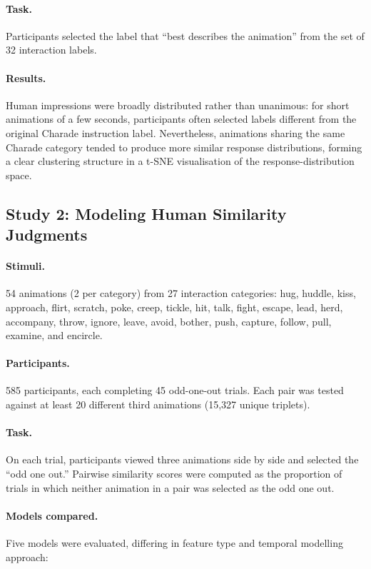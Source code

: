 \documentclass[11pt,a4paper]{article}
\begin{document}
\paragraph{Task.} Participants selected the label that ``best describes the animation'' from the set of 32 interaction labels.

\paragraph{Results.} Human impressions were broadly distributed rather than unanimous: for short animations of a few seconds, participants often selected labels different from the original Charade instruction label. Nevertheless, animations sharing the same Charade category tended to produce more similar response distributions, forming a clear clustering structure in a t-SNE visualisation of the response-distribution space.

\subsection{Study 2: Modeling Human Similarity Judgments}

\paragraph{Stimuli.} 54 animations (2 per category) from 27 interaction categories: hug, huddle, kiss, approach, flirt, scratch, poke, creep, tickle, hit, talk, fight, escape, lead, herd, accompany, throw, ignore, leave, avoid, bother, push, capture, follow, pull, examine, and encircle.

\paragraph{Participants.} 585 participants, each completing 45 odd-one-out trials. Each pair was tested against at least 20 different third animations (15,327 unique triplets).

\paragraph{Task.} On each trial, participants viewed three animations side by side and selected the ``odd one out.'' Pairwise similarity scores were computed as the proportion of trials in which neither animation in a pair was selected as the odd one out.

\paragraph{Models compared.} Five models were evaluated, differing in feature type and temporal modelling approach:
\end{document}
